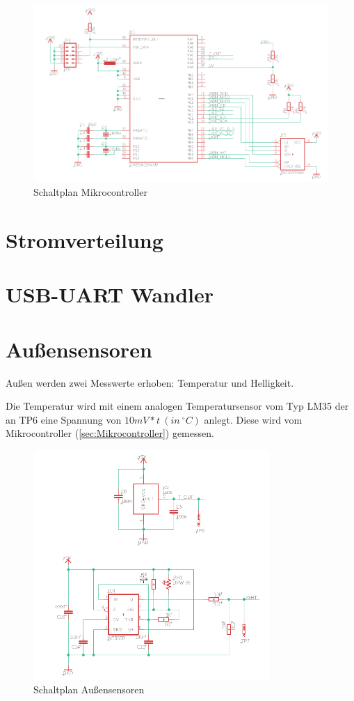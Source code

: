 \documentclass[12pt, a4paper, oneside]{report}
\begin{document}
\begin{figure}[h]
	\centering
	\includegraphics[width=1\textwidth]{pic/Microcontroller}
	\caption{Schaltplan Mikrocontroller}
	\label{fig:Microcontroller}
\end{figure}

\section{Stromverteilung}
\label{sec:Stromverteilung}

\section{USB-UART Wandler}
\label{sec:USB-UART Wandler}

\pagebreak
\section{Außensensoren}
\label{sec:Außensensoren}
Außen werden zwei Messwerte erhoben: Temperatur und Helligkeit.

Die Temperatur wird mit einem analogen Temperatursensor vom Typ LM35 \cite{ds:temp} der an TP6 eine Spannung von
$ 10mV * t~(in~^\circ C)$ anlegt. Diese wird vom Mikrocontroller (\autoref{sec:Mikrocontroller}) gemessen.

\begin{figure}[h]
	\centering
	\includegraphics[width=0.8\textwidth]{pic/OutsideSensors}
	\caption{Schaltplan Außensensoren}
	\label{fig:Außensensor}
\end{figure}
\end{document}
